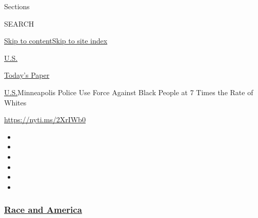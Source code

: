 Sections

SEARCH

\protect\hyperlink{site-content}{Skip to
content}\protect\hyperlink{site-index}{Skip to site index}

\href{https://www.nytimes3xbfgragh.onion/section/us}{U.S.}

\href{https://myaccount.nytimes3xbfgragh.onion/auth/login?response_type=cookie\&client_id=vi}{}

\href{https://www.nytimes3xbfgragh.onion/section/todayspaper}{Today's
Paper}

\href{/section/us}{U.S.}\textbar{}Minneapolis Police Use Force Against
Black People at 7 Times the Rate of Whites

\url{https://nyti.ms/2XrIWb0}

\begin{itemize}
\item
\item
\item
\item
\item
\item
\end{itemize}

\hypertarget{race-and-america}{%
\subsubsection{\texorpdfstring{\href{https://www.nytimes3xbfgragh.onion/news-event/george-floyd-protests-minneapolis-new-york-los-angeles?name=styln-george-floyd\&region=TOP_BANNER\&variant=undefined\&block=storyline_menu_recirc\&action=click\&pgtype=Interactive\&impression_id=48631ff0-e3ab-11ea-adff-4dc7383067ec}{Race
and America}}{Race and America}}\label{race-and-america}}


